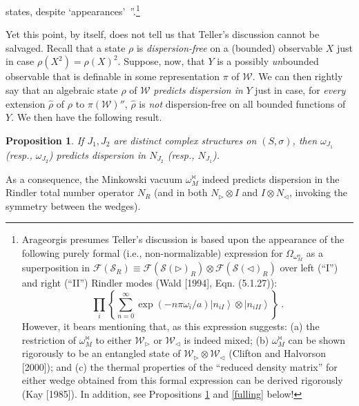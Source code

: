 \documentclass[12pt]{article}
\newtheorem{prop}{Proposition}
\theoremstyle{remark}
\theoremstyle{definition}
\newcommand{\alg}[1]{\mathcal{#1}}
\newcommand{\hil}[1]{\mathcal{#1}}
\begin{document}
states, despite `appearances'~''.\footnote{Arageorgis presumes 
Teller's discussion is based upon the appearance of the following purely formal 
(i.e., non-normalizable) expression 
for $\Omega_{\omega_{M}^{\bowtie}}$ as a superposition in 
$\hil{F}(\hil{S}_{R})\equiv\hil{F}(\hil{S}(\triangleright)_{R})\otimes
\hil{F}(\hil{S}(\triangleleft)_{R})$ over left (``I'') and right (``II'') Rindler 
modes (Wald [1994], Eqn. (5.1.27)): 
\begin{equation} \nonumber
\prod_{i}\left\{ \sum_{n=0}^{\infty }\exp (-n\pi \omega _{i}/a)\left|
n_{iI}\right\rangle \otimes \left| n_{iII}\right\rangle \right\}\ .
\end{equation} However, it bears mentioning that, as this expression 
suggests: (a) the restriction of 
$\omega_{M}^{\bowtie}$ 
to either $\alg{W}_{\triangleright}$ or $\alg{W}_{\triangleleft}$ is 
indeed mixed; (b)  $\omega_{M}^{\bowtie}$ can be shown rigorously to be an entangled 
state of $\alg{W}_{\triangleright}\otimes\alg{W}_{\triangleleft}$ 
(Clifton and Halvorson [2000]); and (c) the thermal properties of the 
``reduced density matrix'' for either wedge obtained from this formal 
expression can be derived rigorously (Kay [1985]).   In addition, see Propositions 
\ref{teller} and \ref{fulling} below!}   

Yet this point, by itself, does not tell us that Teller's 
discussion cannot be salvaged.  Recall that 
a state $\rho$ is \emph{dispersion-free} on a (bounded)
observable $X$ just in case $\rho (X^{2})=\rho (X)^{2}$.  Suppose, now,
that $Y$ is a possibly \emph{un}bounded observable that is definable in some
representation $\pi$ of $\alg{W}$.  We can then rightly 
say that an algebraic state $\rho$ of $\alg{W}$ \emph{predicts dispersion in} $Y$ just
in case, for \emph{every} extension $\hat{\rho}$ of $\rho$ to
$\pi(\alg{W})''$, $\hat{\rho}$ is \emph{not}
dispersion-free on all bounded functions of $Y$. We then have the 
following result.

\begin{prop}  \label{teller} If $J_{1},J_{2}$ are distinct complex structures on 
$(S,\sigma )$, then $\omega _{J_{1}}$ (resp., $\omega _{J_{2}}$) predicts 
dispersion in $N_{J_{2}}$ (resp., $N_{J_{1}}$). \end{prop}

 \noindent As a consequence, the Minkowski vacuum $\omega_{M}^{\bowtie}$ 
indeed predicts dispersion in the Rindler total number operator $N_{R}$ (and 
in both $N_{\triangleright}\otimes I$ and $I\otimes N_{\triangleleft}$, 
invoking the symmetry between the wedges).
 
\end{document}
